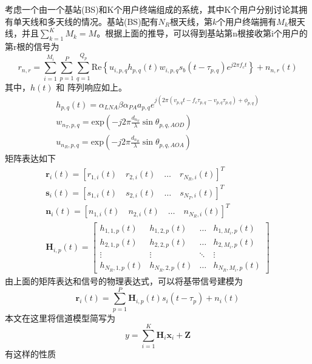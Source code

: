 \documentclass[bachelor,nocolorlinks, printoneside]{seuthesis} %
\begin{document}
\begin{Main}
考虑一个由一个基站(BS)和K个用户终端组成的系统，其中K个用户分别讨论其拥有单天线和多天线的情况。基站(BS)配有$N_R$根天线，第$k$个用户终端拥有$M_k$根天线，并且$\sum_{k=1}^K M_k = M$。根据上面的推导，可以得到基站第n根接收第i个用户的第r根的信号为
\begin{equation}\label{key}
r_{n,r} = \sum^{M_i}_{i=1} \sum_{p=1}^{P} \sum_{q=1}^{Q_p} \mathrm{Re} \left \lbrace u_{i,p,q} h_{p,q} (t) w_{i,p,q} s_b(t-\tau_{p,q}) e^{j 2\pi f_c t} \right \rbrace + n_{n,r}(t)
\end{equation}
其中，$h(t)$ 和 阵列响应如上。
\begin{eqnarray}\label{key}
h_{p,q}(t) = \alpha_{LNA}\beta\alpha_{PA}a_{p,q}e^{j(2\pi 
	(v_{p,q}t-f_{c}\tau_{p,q}-v_{p,q}\tau_{p,q})+\phi_{p,q}
	)} \\
w_{n_{T},p,q} = \mathrm{exp}(-j2\pi \frac{d_{n_{T}}}{\lambda}\sin \theta_{p,q,AOD})\\
u_{n_{R},p,q} = \mathrm{exp}(-j2\pi \frac{d_{n_{R}}}{\lambda}\sin \theta_{p,q,AOA})
\end{eqnarray}
矩阵表达如下
\begin{eqnarray}\label{key}
\mathbf{r}_{i}(t) = [r_{1,i}(t) \quad r_{2,i}(t) \quad\dots\quad r_{N_{R},i}(t)]^{T} \\
\mathbf{s}_{i}(t) = [s_{1,i}(t) \quad s_{2,i}(t) \quad\dots\quad s_{N_{T},i}(t)]^{T} \\
\mathbf{n}_{i}(t) = [n_{1,i}(t) \quad n_{2,i}(t) \quad\dots\quad n_{N_{R},i}(t)]^{T} \\
\mathbf{H}_{i,p}(t) = \left[ \begin{array}{cccc}
h_{1,1,p}(t) & h_{1,2,p}(t) & \ldots & h_{1,M_{i},p}(t) \\
h_{2,1,p}(t) & h_{2,2,p}(t) & \ldots & h_{2,M_{i},p}(t) \\
\vdots & \vdots & \ddots & \vdots \\
h_{N_{R},1,p}(t) & h_{N_{R},2,p}(t) & \ldots & h_{N_{R},M_{i},p}(t)
\end{array} \right] 
\end{eqnarray}
由上面的矩阵表达和信号的物理表达式，可以将基带信号建模为
\begin{equation}\label{key}
\mathbf{r}_{i}(t) = \sum_{p=1}^{P}\mathbf{H}_{i,p}(t)s_{i}(t-\tau_{p}) + n_{i}(t)
\end{equation}
本文在这里将信道模型简写为
\begin{equation}\label{key}
y = \sum_{i=1}^{K} \mathbf{H}_i \mathbf{x}_i + \mathbf{Z}
\end{equation}
有这样的性质
\begin{equation}\label{key}

\end{equation}
\end{Main}
\end{document}
